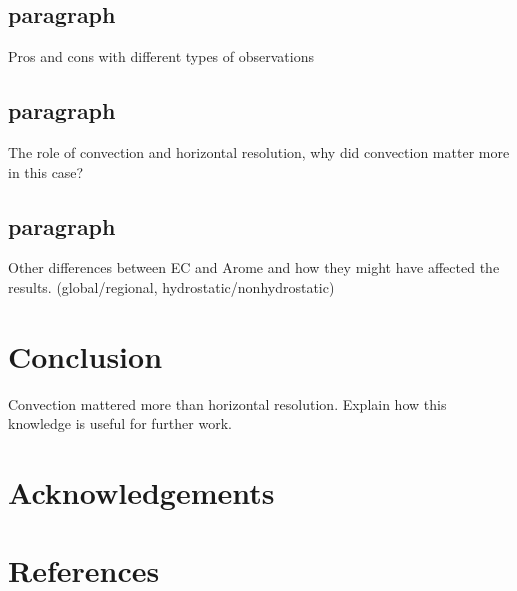 \documentclass[a4paper,10pt]{article}
\begin{document}
  \subsection{paragraph}
    Pros and cons with different types of observations
  \subsection{paragraph}
    The role of convection and horizontal resolution, why did convection matter more in this case?
  \subsection{paragraph}
    Other differences between EC and Arome and how they might have affected the results. (global/regional, hydrostatic/nonhydrostatic)


\section{Conclusion}
  Convection mattered more than horizontal resolution.
  Explain how this knowledge is useful for further work.

\section{Acknowledgements}

\section{References}
\end{document}
